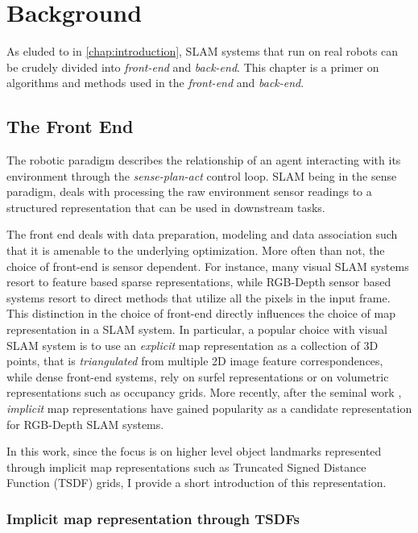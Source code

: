 
\chapter{Background} \label{chap:background}

As eluded to in \ref{chap:introduction}, SLAM systems that run on real robots can be crudely divided into \emph{front-end} and \emph{back-end}. This chapter is a primer on algorithms and methods used in the \emph{front-end} and \emph{back-end}.

\section{The Front End}

The robotic paradigm describes the relationship of an agent interacting with its environment through the \emph{sense-plan-act} control loop. SLAM being in the sense paradigm, deals with processing the raw environment sensor readings to a structured representation that can be used in downstream tasks.

The front end deals with data preparation, modeling and data association such that it is amenable to the underlying optimization. More often than not, the choice of front-end is sensor dependent. For instance, many visual SLAM systems resort to feature based sparse representations, while RGB-Depth sensor based systems resort to direct methods that utilize all the pixels in the input frame. This distinction in the choice of front-end directly influences the choice of map representation in a SLAM system. In particular, a popular choice with visual SLAM system is to use an \emph{explicit} map representation as a collection of 3D points, that is \emph{triangulated} from multiple 2D image feature correspondences, while dense front-end systems, rely on surfel representations or on volumetric representations such as occupancy grids. More recently, after the seminal work \cite{newcombeKinectFusionRealtimeDense2011}, \emph{implicit} map representations have gained popularity as a candidate representation for RGB-Depth SLAM systems.

In this work, since the focus is on higher level object landmarks represented through implicit map representations such as Truncated Signed Distance Function (TSDF) grids, I provide a short introduction of this representation.

\subsection{Implicit map representation through TSDFs}

